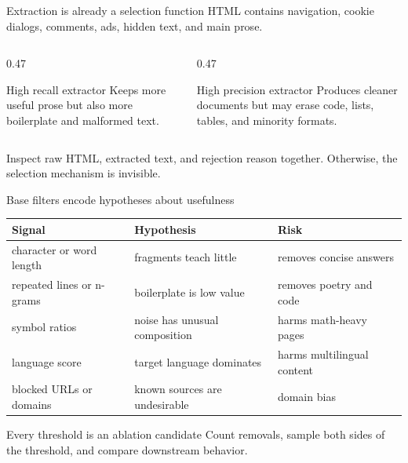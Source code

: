 \documentclass[handout]{beamer}
\begin{document}
\begin{frame}{Extraction is already a selection function}
  HTML contains navigation, cookie dialogs, comments, ads, hidden text, and main prose.
  \vspace{5pt}
  \begin{columns}[t]
    \begin{column}{0.47\linewidth}
      \begin{block}{High recall extractor}
        Keeps more useful prose but also more boilerplate and malformed text.
      \end{block}
    \end{column}
    \begin{column}{0.47\linewidth}
      \begin{alertblock}{High precision extractor}
        Produces cleaner documents but may erase code, lists, tables, and minority formats.
      \end{alertblock}
    \end{column}
  \end{columns}
  \vfill
  Inspect raw HTML, extracted text, and rejection reason together. Otherwise, the selection mechanism is invisible.
\end{frame}

\begin{frame}{Base filters encode hypotheses about usefulness}
  \small
  \begin{tabular}{@{}>{\raggedright\arraybackslash}p{.22\linewidth}>{\raggedright\arraybackslash}p{.34\linewidth}>{\raggedright\arraybackslash}p{.34\linewidth}@{}}
    \toprule
    Signal & Hypothesis & Risk \\
    \midrule
    character or word length & fragments teach little & removes concise answers \\
    repeated lines or n-grams & boilerplate is low value & removes poetry and code \\
    symbol ratios & noise has unusual composition & harms math-heavy pages \\
    language score & target language dominates & harms multilingual content \\
    blocked URLs or domains & known sources are undesirable & domain bias \\
    \bottomrule
  \end{tabular}
  \vfill
  \begin{block}{Every threshold is an ablation candidate}
    Count removals, sample both sides of the threshold, and compare downstream behavior.
  \end{block}
\end{frame}
\end{document}
